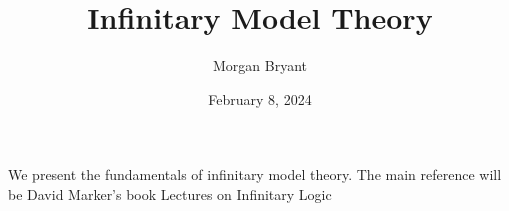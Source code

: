 \documentclass[a4paper]{article}
\title{Infinitary Model Theory}
\date{February 8, 2024}
\author{Morgan Bryant}
\begin{document}
\maketitle
\par{We present the fundamentals of infinitary model theory. The main reference will be David Marker's book Lectures on Infinitary Logic}
\printbibliography
\end{document}
